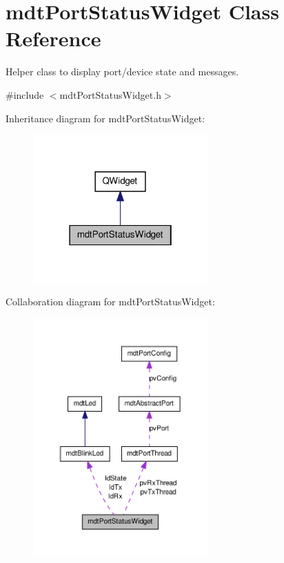 \hypertarget{classmdt_port_status_widget}{\section{mdt\-Port\-Status\-Widget Class Reference}
\label{classmdt_port_status_widget}
}


Helper class to display port/device state and messages.  




{\ttfamily \#include $<$mdt\-Port\-Status\-Widget.\-h$>$}



Inheritance diagram for mdt\-Port\-Status\-Widget\-:
\nopagebreak
\begin{figure}[H]
\begin{center}
\leavevmode
\includegraphics[width=190pt]{classmdt_port_status_widget__inherit__graph}
\end{center}
\end{figure}


Collaboration diagram for mdt\-Port\-Status\-Widget\-:
\nopagebreak
\begin{figure}[H]
\begin{center}
\leavevmode
\includegraphics[width=190pt]{classmdt_port_status_widget__coll__graph}
\end{center}
\end{figure}
